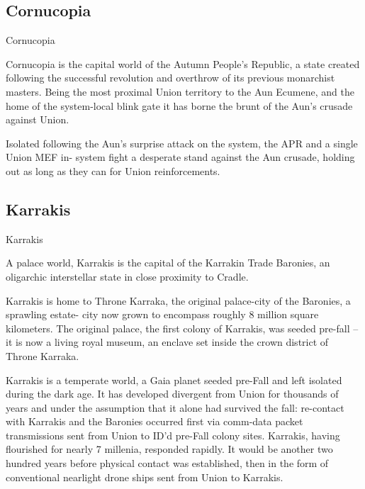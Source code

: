 \subsection{Cornucopia}
Cornucopia  
   
Cornucopia is the capital world of the Autumn People’s Republic, a state created following the  
successful revolution and overthrow of its previous monarchist masters. Being the most proximal  
Union territory to the Aun Ecumene, and the home of the system-local blink gate it has borne the  
brunt of the Aun’s crusade against Union.  
 

Isolated following the Aun’s surprise attack on the system, the APR and a single Union MEF in- 
system fight a desperate stand against the Aun crusade, holding out as long as they can for  
Union reinforcements. 
 
\subsection{Karrakis}
Karrakis  

A palace world, Karrakis is the capital of the Karrakin Trade Baronies, an oligarchic interstellar  
state in close proximity to Cradle.   

Karrakis is home to Throne Karraka, the original palace-city of the Baronies, a sprawling estate- 
city now grown to encompass roughly 8 million square kilometers. The original palace, the first  
colony of Karrakis, was seeded pre-fall -- it is now a living royal museum, an enclave set inside  
the crown district of Throne Karraka.    

                                                                                                               


Karrakis is a temperate world, a Gaia planet seeded pre-Fall and left isolated during the dark age.  
It has developed divergent from Union for thousands of years and under the assumption that it  
alone had survived the fall: re-contact with Karrakis and the Baronies occurred first via comm-data  
packet transmissions sent from Union to ID’d pre-Fall colony sites. Karrakis, having flourished for  
nearly 7 millenia, responded rapidly. It would be another two hundred years before physical  
contact was established, then in the form of conventional nearlight drone ships sent from Union to  
Karrakis.   

